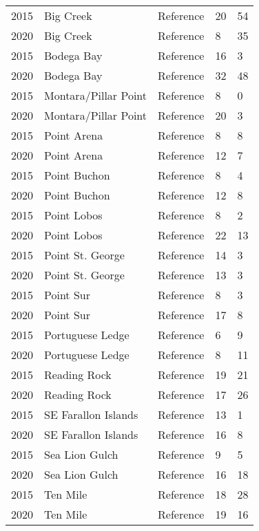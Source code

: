 \documentclass[11pt,
  english,
  letterpaper,
]{article}
\begin{document}
\begin{longtable}[t]{l>{\raggedright\arraybackslash}p{3cm}lll}
2015 & Big Creek & Reference & 20 & 54\\
2020 & Big Creek & Reference & 8 & 35\\
2015 & Bodega Bay & Reference & 16 & 3\\
2020 & Bodega Bay & Reference & 32 & 48\\
2015 & Montara/Pillar Point & Reference & 8 & 0\\
2020 & Montara/Pillar Point & Reference & 20 & 3\\
2015 & Point Arena & Reference & 8 & 8\\
2020 & Point Arena & Reference & 12 & 7\\
2015 & Point Buchon & Reference & 8 & 4\\
2020 & Point Buchon & Reference & 12 & 8\\
2015 & Point Lobos & Reference & 8 & 2\\
2020 & Point Lobos & Reference & 22 & 13\\
2015 & Point St. George & Reference & 14 & 3\\
2020 & Point St. George & Reference & 13 & 3\\
2015 & Point Sur & Reference & 8 & 3\\
2020 & Point Sur & Reference & 17 & 8\\
2015 & Portuguese Ledge & Reference & 6 & 9\\
2020 & Portuguese Ledge & Reference & 8 & 11\\
2015 & Reading Rock & Reference & 19 & 21\\
2020 & Reading Rock & Reference & 17 & 26\\
2015 & SE Farallon Islands & Reference & 13 & 1\\
2020 & SE Farallon Islands & Reference & 16 & 8\\
2015 & Sea Lion Gulch & Reference & 9 & 5\\
2020 & Sea Lion Gulch & Reference & 16 & 18\\
2015 & Ten Mile & Reference & 18 & 28\\
2020 & Ten Mile & Reference & 19 & 16\\*
\end{longtable}
\endgroup{}
\endgroup{}

\FloatBarrier

\newpage

\begingroup\fontsize{10}{12}\selectfont
\begingroup\fontsize{10}{12}\selectfont
\end{document}
